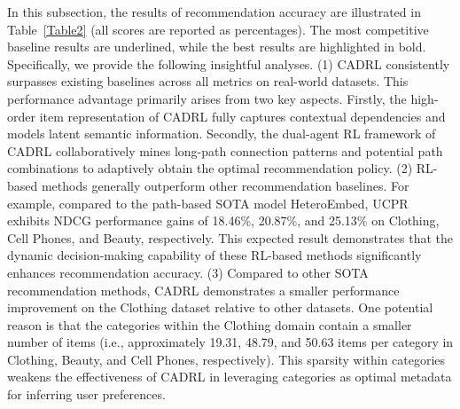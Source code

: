 \documentclass[conference]{IEEEtran}
\begin{document}
In this subsection, the results of recommendation accuracy are illustrated in Table~\ref{Table2} (all scores are reported as percentages). The most competitive baseline results are underlined, while the best results are highlighted in bold.  Specifically, we provide the following insightful analyses. (1) 
CADRL consistently surpasses existing baselines across all metrics on real-world datasets. This performance advantage primarily arises from two key aspects. Firstly, the high-order item representation of CADRL fully captures contextual dependencies and models latent semantic information. Secondly, the dual-agent RL  framework of CADRL collaboratively mines long-path connection patterns and  potential path combinations to adaptively obtain the optimal recommendation policy. (2) RL-based methods generally outperform other recommendation baselines. For example, compared to the path-based SOTA model HeteroEmbed, UCPR exhibits  NDCG performance gains of 18.46\%, 20.87\%, and 25.13\% on Clothing, Cell Phones, and Beauty, respectively. This expected result demonstrates that the dynamic decision-making capability of these RL-based methods  significantly enhances recommendation accuracy. (3) Compared to other SOTA recommendation methods, CADRL demonstrates a smaller performance improvement on the Clothing dataset relative to other datasets.  One potential reason is that the categories 
 within the Clothing domain contain a smaller number of items (i.e., approximately 19.31, 48.79, and 50.63 items per category in Clothing, Beauty, and Cell Phones, respectively). This sparsity within categories weakens the effectiveness of CADRL in leveraging categories as optimal metadata for inferring user preferences.




\end{document}
